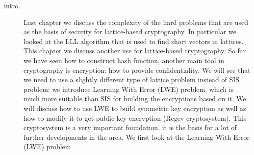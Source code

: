     \begin{description}
        \item[intro.] Last chapter we discuss the complexity of the hard
            problems that are used as the basis of security for lattice-based
            cryptography. In particular we looked at the LLL algorithm that is
            used to find short vectors in lattices. This chapter we discuss
            another use for lattice-based cryptography. So far we have seen how
            to construct hash function, another main tool in cryptography is
            encryption: how to provide confidentiality. We will see that we need
            to use a slightly different type of lattice problem instead of SIS
            problem: we introduce Learning With Error (LWE) problem, which is
            much more suitable than SIS for building the encryptions based on
            it. We will discuss how to use LWE to build symmetric key encryption
            as well as how to modify it to get public key encryption (Regev
            cryptosystem). This cryptosystem is a very important foundation, it
            is the basis for a lot of further
            developments in the area. We first look at the Learning With Error
            (LWE) problem


\end{description}
